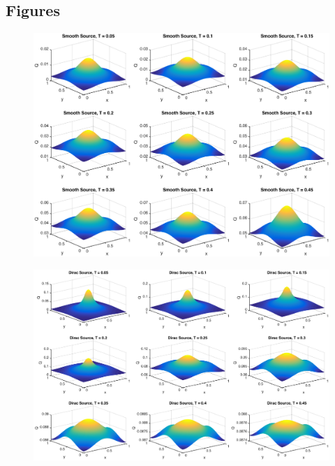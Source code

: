 \subsection{Figures}
\begin{figure}[!htb]
\centering
\includegraphics[scale=.5]{smoothSource4_1.eps}
\caption{}
\label{fig:digraph}
\end{figure}

\begin{figure}[!htb]
\centering
\includegraphics[scale=.5]{diracSource4_1.eps}
\caption{}
\label{fig:digraph}
\end{figure}

